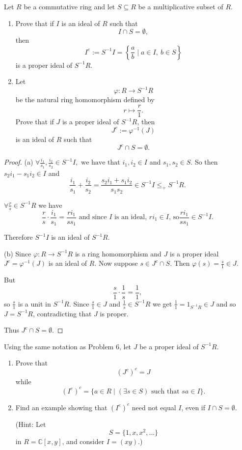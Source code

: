 \documentclass[addpoints,10pt]{exam}
\theoremstyle{plain}
\theoremstyle{definition}
\newtheorem{prob}[thm]{Problem}
\theoremstyle{plain}
\theoremstyle{definition}
\let\oldprob\prob
\let\endoldprob\endprob
\renewenvironment{prob}
  {\begin{singlespace}\oldprob}
  {\endoldprob\end{singlespace}}
\newcommand{\CC}{\ensuremath{\mathbb{C}}}
\begin{document}
\newpage
\begin{prob}
Let $R$ be a commutative ring and let $S\subseteq R$ be a multiplicative subset of $R$.

\begin{enumerate}[label=(\alph*)]
\item Prove that if $I$ is an ideal of $R$ such that
\[
I\cap S=\emptyset,
\]
then
\[
I^e:=S^{-1}I=\left\{\frac{a}{b}\mid a\in I,\ b\in S\right\}
\]
is a proper ideal of $S^{-1}R$.

\item Let
\[
\varphi:R\to S^{-1}R
\]
be the natural ring homomorphism defined by
\[
r\mapsto \frac r1.
\]
Prove that if $J$ is a proper ideal of $S^{-1}R$, then
\[
J^c:=\varphi^{-1}(J)
\]
is an ideal of $R$ such that
\[
J^c\cap S=\emptyset.
\]
\end{enumerate}
\end{prob}

\begin{proof}
(a)
$\forall \frac{i_1}{s_1},\frac{i_2}{s_2}\in S^{-1}I,\text{ we have that }i_1,i_2\in I$ and $s_1,s_2\in S$. So then 
$s_2i_1-s_1i_2\in I$ and
\[
\frac{i_1}{s_1}+\frac{i_2}{s_2}
=
\frac{s_2i_1+s_1i_2}{s_1s_2}
\in S^{-1}I\leq_{+}S^{-1}R.
\]

$\forall\frac{r}{s}\in S^{-1}R$ we have
\[
\frac{r}{s}\cdot\frac{i_1}{s_1}
=
\frac{ri_1}{ss_1}\text{ and since $I$ is an ideal, $ri_1\in I$, so
$\frac{ri_1}{ss_1}\in S^{-1}I$.}
\]


Therefore $S^{-1}I$ is an ideal of $S^{-1}R$.

(b)
Since $\varphi:R\to S^{-1}R$ is a ring homomorphism and $J$ is a proper ideal
$J^c=\varphi^{-1}(J)$ is an ideal of $R$. Now suppose $s\in J^c\cap S$. Then
$\varphi(s)=\frac{s}{1}\in J$.

But
\[
\frac{s}{1}\cdot\frac{1}{s}=\frac{1}{1},
\]
so $\frac{s}{1}$ is a unit in $S^{-1}R$. Since $\frac{s}{1}\in J$ and $\frac{1}{s}\in S^{-1}R$
we get $\frac{1}{1}=1_{S^{-1}R}\in J$ and so $J=S^{-1}R$, contradicting that $J$ is proper.

Thus $J^c\cap S=\emptyset$.

\end{proof}

\newpage
\begin{prob}
Using the same notation as Problem 6, let $J$ be a proper ideal of $S^{-1}R$.

\begin{enumerate}[label=(\alph*)]
\item Prove that
\[
(J^c)^e=J
\]
while
\[
(I^e)^c=\{a\in R\mid (\exists s\in S)\text{ such that } sa\in I\}.
\]

\item Find an example showing that $(I^e)^c$ need not equal $I$, even if $I\cap S=\emptyset$.

(Hint: Let
\[
S=\{1,x,x^2,\dots\}
\]
in $R=\CC[x,y]$, and consider $I=(xy)$.)
\end{enumerate}
\end{prob}
\end{document}
